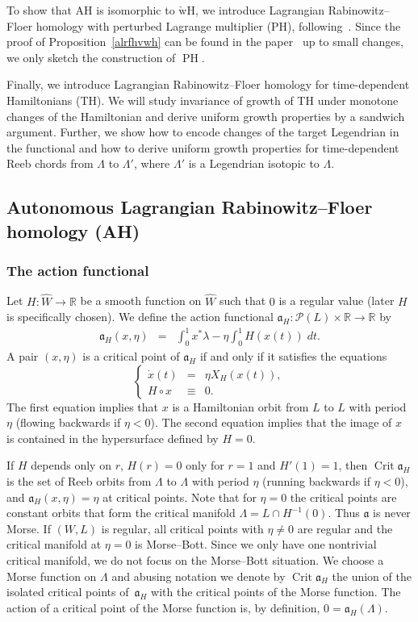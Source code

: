 \documentclass{amsart}
\newcommand{\Pcal}{{\mathcal{P}}}
\newcommand{\acal}{\mathfrak{a}}
\newcommand{\RR}{\mathbb{R}}
\newcommand{\PH}{\operatorname{PH}}
\newcommand{\WcheckH}{\operatorname{\check wH}}
\newcommand{\Crit}{\operatorname{Crit}}
\newcommand{\haat}{\widehat}
\theoremstyle{definition}
\theoremstyle{remark}
\numberwithin{equation}{section}
\begin{document}
To show that AH is isomorphic to $\WcheckH$, we introduce Lagrangian Rabinowitz--Floer homology with perturbed Lagrange multiplier (PH), following~\cite{CFO10}. Since the proof of Proposition~\ref{alrfhvwh} can be found in the paper~\cite{CFO10} up to small changes, we only sketch the construction of $\PH$. 

Finally, we introduce Lagrangian Rabinowitz--Floer homology for time-dependent Hamiltonians (TH). We will study invariance of growth of TH under monotone changes of the Hamiltonian and derive uniform growth properties by a sandwich argument. Further, we show how to encode changes of the target Legendrian in the functional and how to derive uniform growth properties for time-dependent Reeb chords from $\Lambda$ to $\Lambda'$, where $\Lambda'$ is a Legendrian isotopic to $\Lambda$.

\subsection{Autonomous Lagrangian Rabinowitz--Floer homology (AH)}\label{sec:alrfh}
\subsubsection*{The action functional}
Let $H:\haat W\to \RR$ be a smooth function on $\haat W$ such that $0$ is a regular value (later $H$ is specifically chosen). We define the action functional $\acal_{H}:\Pcal(L)\times \RR\to\RR$ by 
\begin{eqnarray}\label{acal}
	\acal_{H}(x,\eta)&=&\int_0^1x^*\lambda-\eta\int_0^1H(x(t))\;dt.
\end{eqnarray}
A pair $(x,\eta)$ is a critical point of $\acal_H$ if and only if it satisfies the equations
\begin{equation*}\label{crit:alrfh}
\left\{\begin{array}{rcl}
		\dot x(t)&=&\eta X_{H}(x(t)),\\
		H\circ x&\equiv&0.
	\end{array}\right.
\end{equation*}
The first equation implies that $x$ is a Hamiltonian orbit from $L$ to $L$ with period $\eta$ (flowing backwards if $\eta<0$). The second equation implies that the image of $x$ is contained in the hypersurface defined by $H=0$.

If $H$ depends only on $r$, $H(r)=0$ only for $r=1$ and $H'(1)=1$, then $\Crit\acal_H$ is the set of Reeb orbits from $\Lambda$ to $\Lambda$ with period $\eta$ (running backwards if $\eta<0$), and $\acal_H(x,\eta)=\eta$ at critical points. Note that for $\eta=0$ the critical points are constant orbits that form the critical manifold $\Lambda=L\cap H^{-1}(0)$. Thus $\acal$ is never Morse. If $(W,L)$ is regular, all critical points with $\eta\neq0$ are regular and the critical manifold at $\eta=0$ is Morse--Bott. Since we only have one nontrivial critical manifold, we do not focus on the Morse--Bott situation. We choose a Morse function on $\Lambda$ and abusing notation we denote by $\Crit\acal_H$ the union of the isolated critical points of~$\acal_H$ with the critical points of the Morse function. The action of a critical point of the Morse function is, by definition, $0=\acal_H(\Lambda)$.
\end{document}
